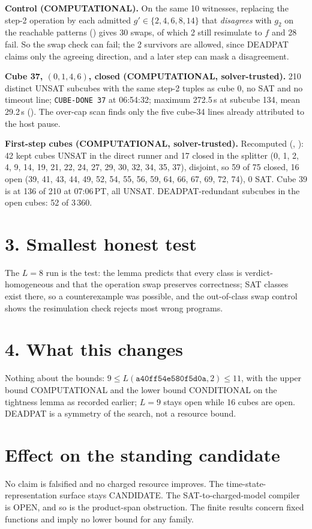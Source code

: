 \documentclass[11pt]{article}
\begin{document}
\textbf{Control (COMPUTATIONAL).} On the same 10 witnesses, replacing the step-2 operation by each admitted $g'\in\{2,4,6,8,14\}$ that \emph{disagrees} with $g_2$ on the reachable patterns () gives 30 swaps, of which 2 still resimulate to $f$ and 28 fail. So the swap check can fail; the 2 survivors are allowed, since DEADPAT claims only the agreeing direction, and a later step can mask a disagreement.

\textbf{Cube 37, $(0,1,4,6)$, closed (COMPUTATIONAL, solver-trusted).} 210 distinct UNSAT subcubes with the same step-2 tuples as cube 0, no SAT and no timeout line; \texttt{CUBE-DONE 37} at 06:54:32; maximum 272.5\,s at subcube 134, mean 29.2\,s (). The over-cap scan finds only the five cube-34 lines already attributed to the host pause.

\textbf{First-step cubes (COMPUTATIONAL, solver-trusted).} Recomputed (, ): 42 kept cubes UNSAT in the direct runner and 17 closed in the splitter (0, 1, 2, 4, 9, 14, 19, 21, 22, 24, 27, 29, 30, 32, 34, 35, 37), disjoint, so 59 of 75 closed, 16 open (39, 41, 43, 44, 49, 52, 54, 55, 56, 59, 64, 66, 67, 69, 72, 74), 0 SAT. Cube 39 is at 136 of 210 at 07:06\,PT, all UNSAT. DEADPAT-redundant subcubes in the open cubes: 52 of 3\,360.

\section*{3. Smallest honest test}
The $L=8$ run is the test: the lemma predicts that every class is verdict-homogeneous and that the operation swap preserves correctness; SAT classes exist there, so a counterexample was possible, and the out-of-class swap control shows the resimulation check rejects most wrong programs.

\section*{4. What this changes}
Nothing about the bounds: $9\le L(\texttt{a40ff54e580f5d0a},2)\le 11$, with the upper bound COMPUTATIONAL and the lower bound CONDITIONAL on the tightness lemma as recorded earlier; $L=9$ stays open while 16 cubes are open. DEADPAT is a symmetry of the search, not a resource bound.

\section*{Effect on the standing candidate}
No claim is falsified and no charged resource improves. The time-state-representation surface stays CANDIDATE. The SAT-to-charged-model compiler is OPEN, and so is the product-span obstruction. The finite results concern fixed functions and imply no lower bound for any family.
\end{document}
